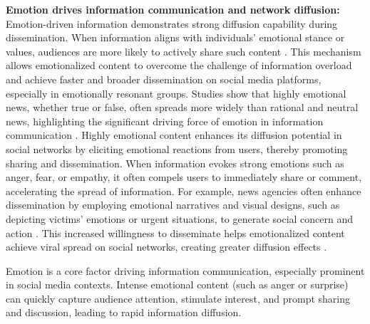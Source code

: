 \textbf{Emotion drives information communication and network diffusion:} Emotion-driven information demonstrates strong diffusion capability during dissemination. When information aligns with individuals’ emotional stance or values, audiences are more likely to actively share such content \cite{ferrara2015measuring}. This mechanism allows emotionalized content to overcome the challenge of information overload and achieve faster and broader dissemination on social media platforms, especially in emotionally resonant groups. Studies show that highly emotional news, whether true or false, often spreads more widely than rational and neutral news, highlighting the significant driving force of emotion in information communication \cite{berger2011arousal, stieglitz2013emotions}. Highly emotional content enhances its diffusion potential in social networks by eliciting emotional reactions from users, thereby promoting sharing and dissemination. When information evokes strong emotions such as anger, fear, or empathy, it often compels users to immediately share or comment, accelerating the spread of information. For example, news agencies often enhance dissemination by employing emotional narratives and visual designs, such as depicting victims’ emotions or urgent situations, to generate social concern and action \cite{lopez2021translating}. This increased willingness to disseminate helps emotionalized content achieve viral spread on social networks, creating greater diffusion effects \cite{de2021sadness, son2022emotion}.

Emotion is a core factor driving information communication, especially prominent in social media contexts. Intense emotional content (such as anger or surprise) can quickly capture audience attention, stimulate interest, and prompt sharing and discussion, leading to rapid information diffusion.


